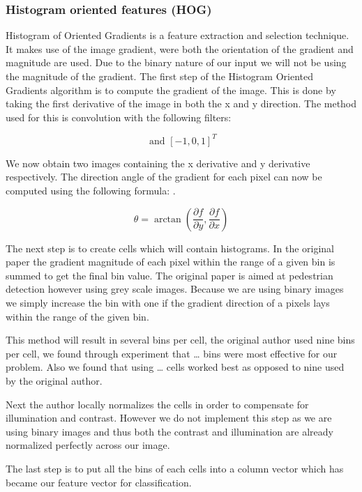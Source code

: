 \documentclass[%
        compressed,
        final,
        notitlepage,
        narroweqnarray,
        inline,
        twoside,
        ]{ieee}
\begin{document}
\subsubsection{Histogram oriented features (HOG)}
Histogram of Oriented Gradients is a feature extraction and selection technique. It makes use of the image gradient, were both the orientation of the gradient and magnitude are used. Due to the binary nature of our input we will not be using the magnitude of the gradient. The first step of the Histogram Oriented Gradients algorithm is to compute the gradient of the image. This is done by taking the first derivative of the image in both the x and y direction. The method used for this is convolution with the following filters:

\begin{equation}
    [-1, 0, 1] \text{ and } [-1, 0, 1]^T
\end{equation}

We now obtain two images containing the x derivative and y derivative respectively. The direction angle of the gradient for each pixel can now be computed using the following formula: .

\begin{equation}
    \theta = \arctan\left(\frac{\partial f}{\partial y}, 
        \frac{\partial f}{\partial x}\right)
\end{equation}

The next step is to create cells which will contain histograms. In the original paper the gradient magnitude of each pixel within the range of a given bin is summed to get the final bin value. The original paper is aimed at pedestrian detection however using grey scale images. Because we are using binary images we simply increase the bin with one if the gradient direction of a pixels lays within the range of the given bin.

This method will result in several bins per cell, the original author used nine bins per cell, we found through experiment that … bins were most effective for our problem. Also we found that using … cells worked best as opposed to nine used by the original author.

Next the author locally normalizes the cells in order to compensate for illumination and contrast. However we do not implement this step as we are using binary images and thus both the contrast and illumination are already normalized perfectly across our image.

The last step is to put all the bins of each cells into a column vector which has became our feature vector for classification.
\end{document}
